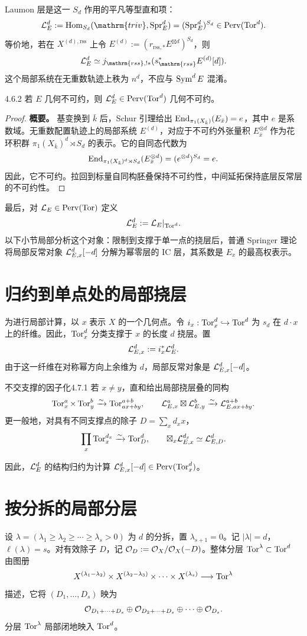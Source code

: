 Laumon 层是这一 $S_d$ 作用的平凡等型直和项：
\[\cL_E^d:=\Hom_{S_d}(\mathrm{triv},\operatorname{Spr}_E^d)=(\operatorname{Spr}_E^d)^{S_d}\in\operatorname{Perv}(\Tor^d).\]
等价地，若在 $X^{(d),\mathrm{rss}}$ 上令 $E^{(d)}:=(r_{\mathrm{rss},*}E^{\boxtimes d})^{S_d}$，则
\[\cL_E^d\simeq j_{\mathrm{rss},!*}(s_{\mathrm{rss}}^*E^{(d)}[d]).\]
这个局部系统在无重数轨迹上秩为 $n^d$，不应与 $\operatorname{Sym}^dE$ 混淆。
\begin{lemma}{}{4.6.2}
若 $E$ 几何不可约，则 $\mathcal{L}_E^d\in\operatorname{Perv}(\operatorname{Tor}^d)$ 几何不可约。
\end{lemma}
\begin{proof}\textbf{概要。}
基变换到 $\bar k$ 后，Schur 引理给出 $\operatorname{End}_{\pi_1(X_{\bar k})}(E_{\bar x})=e$，其中 $e$ 是系数域。无重数配置轨迹上的局部系统 $E^{(d)}$，对应于不可约外张量积 $E_{\bar x}^{\otimes d}$ 作为花环积群 $\pi_1(X_{\bar k})^d\rtimes S_d$ 的表示。它的自同态代数为
\[\operatorname{End}_{\pi_1(X_{\bar k})^d\rtimes S_d}(E_{\bar x}^{\otimes d})=(e^{\otimes d})^{S_d}=e.\]
因此，它不可约。拉回到标量自同构胚叠保持不可约性，中间延拓保持底层反常层的不可约性。
\end{proof}

最后，对 $\mathcal{L}_E\in\operatorname{Perv}(\operatorname{Tor})$ 定义
\[\mathcal{L}_E^d:=\mathcal{L}_E|_{\operatorname{Tor}^d}.\]
以下小节局部分析这个对象：限制到支撑于单一点的挠层后，普通 Springer 理论将局部反常对象 $\mathcal{L}_{E,x}^d[-d]$ 分解为幂零层的 IC 层，其系数是 $E_x$ 的最高权表示。
\section{归约到单点处的局部挠层}\label{sec:4.7}
为进行局部计算，以 $x$ 表示 $X$ 的一个几何点。令 $i_x:\operatorname{Tor}_x^d\hookrightarrow\operatorname{Tor}^d$ 为 $s_d$ 在 $d\cdot x$ 上的纤维。因此，$\operatorname{Tor}_x^d$ 分类支撑于 $x$ 的长度 $d$ 挠层。置
\[\mathcal{L}_{E,x}^d:=i_x^*\mathcal{L}_E^d.\]
由于这一纤维在对称幂方向上余维为 $d$，局部反常对象是 $\mathcal{L}_{E,x}^d[-d]$。
\begin{lemma}{不交支撑的因子化}{4.7.1}
若 $x\ne y$，直和给出局部挠层叠的同构
\[\operatorname{Tor}_x^a\times\operatorname{Tor}_y^b\xrightarrow{\sim}\operatorname{Tor}_{ax+by}^{a+b},\qquad\mathcal{L}_{E,x}^a\boxtimes\mathcal{L}_{E,y}^b\xrightarrow{\sim}\mathcal{L}_{E,ax+by}^{a+b}.\]
更一般地，对具有不同支撑点的除子 $D=\sum_xd_xx$，
\[\prod_x\operatorname{Tor}_x^{d_x}\xrightarrow{\sim}\operatorname{Tor}_D^d,\qquad\boxtimes_x\mathcal{L}_{E,x}^{d_x}\simeq\mathcal{L}_{E,D}^d.\]
\end{lemma}

因此，$\mathcal{L}_E^d$ 的结构归约为计算 $\mathcal{L}_{E,x}^d[-d]\in\operatorname{Perv}(\operatorname{Tor}_x^d)$。
\section{按分拆的局部分层}\label{sec:4.8}
设 $\lambda=(\lambda_1\ge\lambda_2\ge\cdots\ge\lambda_s>0)$ 为 $d$ 的分拆，置 $\lambda_{s+1}=0$。记 $|\lambda|=d$，$\ell(\lambda)=s$。对有效除子 $D$，记 $\mathcal{O}_D:=\mathcal{O}_X/\mathcal{O}_X(-D)$。整体分层 $\operatorname{Tor}^\lambda\subset\operatorname{Tor}^d$ 由图册
\[X^{(\lambda_1-\lambda_2)}\times X^{(\lambda_2-\lambda_3)}\times\cdots\times X^{(\lambda_s)}\longrightarrow\operatorname{Tor}^\lambda\]
描述，它将 $(D_1,\ldots,D_s)$ 映为
\[\mathcal{O}_{D_1+\cdots+D_s}\oplus\mathcal{O}_{D_2+\cdots+D_s}\oplus\cdots\oplus\mathcal{O}_{D_s}.\]
分层 $\operatorname{Tor}^\lambda$ 局部闭地映入 $\operatorname{Tor}^d$。

